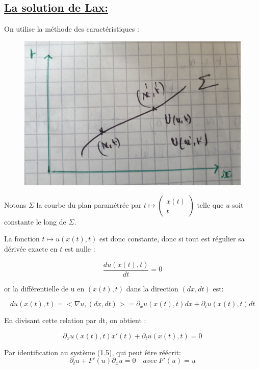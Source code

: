 \subsection[La solution de Lax]{\uline{La solution de Lax:}}

On utilise la m\'ethode des caract\'eristiques : 

\begin{figure}[h!]
	\centering \includegraphics[scale=0.2]{Images_Fichiers/Y1.png}
\end{figure}

Notons $\Sigma$ la courbe du plan param\'etr\'ee par $t\mapsto \left(\begin{array}{c}x(t)\\t\end{array}\right)$ telle que $u$ soit constante le long de $\Sigma$.

La fonction $t\mapsto u(x(t), t)$ est donc constante, donc si tout est r\'egulier sa d\'eriv\'ee exacte en $t$ est nulle :

$$\frac{du(x(t),t)}{dt} = 0$$ 

or la diff\'erentielle de u en $(x(t),t)$ dans la direction $(dx,dt)$ est:

$$ du(x(t),t) = <\nabla u ,(dx,dt)> = \partial_x u(x(t),t)dx+ \partial_t u(x(t), t)dt$$

En divisant cette relation par dt, on obtient :

$$\partial_x u(x(t),t)x'(t)+ \partial_t u(x(t), t)=0$$

Par identification au syst\`eme (1.5), qui peut \^etre r\'e\'ecrit:
$$\partial_t u + F'(u) \partial_x u= 0 \quad avec \; F'(u) = u$$


